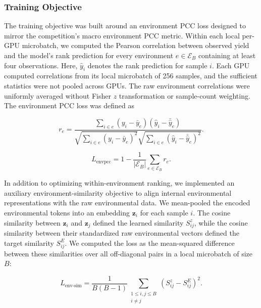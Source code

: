 \subsubsection{Training Objective}\label{sec:ch3-losses}
The training objective was built around an environment PCC loss designed to mirror the competition's macro environment PCC metric. Within each local per-GPU microbatch, we computed the Pearson correlation between observed yield and the model's rank prediction for every environment $e \in \mathcal{E}_B$ containing at least four observations. Here, $\hat{y}_i$ denotes the rank prediction for sample $i$. Each GPU computed correlations from its local microbatch of 256 samples, and the sufficient statistics were not pooled across GPUs. The raw environment correlations were uniformly averaged without Fisher $z$ transformation or sample-count weighting. The environment PCC loss was defined as

\begin{equation}\label{eq:ch3-pcc}
    r_e =
    \frac{\sum_{i \in e} (y_i - \bar{y}_e)(\hat{y}_i - \bar{\hat{y}}_e)}
    {\sqrt{\sum_{i \in e}(y_i - \bar{y}_e)^2}
     \sqrt{\sum_{i \in e}(\hat{y}_i - \bar{\hat{y}}_e)^2}}.
\end{equation}

\begin{equation}\label{eq:ch3-envpcc}
    L_{\mathrm{envpcc}} = 1 - \frac{1}{|\mathcal{E}_B|} \sum_{e \in \mathcal{E}_B} r_e.
\end{equation}

In addition to optimizing within-environment ranking, we implemented an auxiliary environment-similarity objective to align internal environmental representations with the raw environmental data. We mean-pooled the encoded environmental tokens into an embedding $\mathbf{z}_i$ for each sample $i$. The cosine similarity between $\mathbf{z}_i$ and $\mathbf{z}_j$ defined the learned similarity $S^{z}_{ij}$, while the cosine similarity between their standardized raw environmental vectors defined the target similarity $S^{E}_{ij}$. We computed the loss as the mean-squared difference between these similarities over all off-diagonal pairs in a local microbatch of size $B$:

\begin{equation}\label{eq:ch3-env-sim}
    L_{\mathrm{env\text{-}sim}} = \frac{1}{B(B-1)} \sum_{\substack{1 \leq i,j \leq B \\ i \neq j}} (S^{z}_{ij} - S^{E}_{ij})^2 .
\end{equation}

